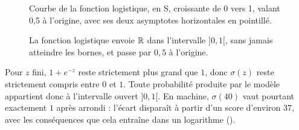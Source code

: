 \begin{figure}[htbp]
\centering
\begin{graphique}{Courbe de la fonction logistique, en S, croissante de 0 vers 1, valant 0,5 à l'origine, avec ses deux asymptotes horizontales en pointillé.}
\end{graphique}
\caption{La fonction logistique envoie $\mathbb{R}$ dans l'intervalle $]0,1[$, sans
jamais atteindre les bornes, et passe par $0{,}5$ à l'origine.}
\label{fig:sigmoide}
\end{figure}
\FloatBarrier

\begin{vigilance}
Pour $z$ fini, $1+e^{-z}$ reste strictement plus grand que $1$, donc $\sigma(z)$
reste strictement compris entre $0$ et $1$. Toute probabilité produite par le
modèle appartient donc à l'intervalle ouvert $]0,1[$. En machine, $\sigma(40)$
vaut pourtant exactement $1$ après arrondi : l'écart disparaît à partir d'un
score d'environ $37$, avec les conséquences que cela entraîne dans un logarithme
().
\end{vigilance}
